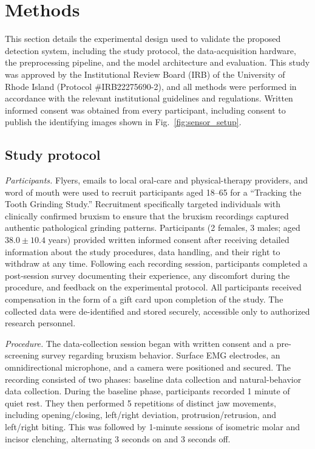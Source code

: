 \documentclass[pdflatex,sn-nature,iicol]{sn-jnl}
\begin{document}
\section{Methods}

This section details the experimental design used to validate the proposed detection system, including the study protocol, the data-acquisition hardware, the preprocessing pipeline, and the model architecture and evaluation. This study was approved by the Institutional Review Board (IRB) of the University of Rhode Island (Protocol \#IRB22275690-2), and all methods were performed in accordance with the relevant institutional guidelines and regulations. Written informed consent was obtained from every participant, including consent to publish the identifying images shown in Fig.~\ref{fig:sensor_setup}.

\subsection{Study protocol}
\textit{Participants.} Flyers, emails to local oral-care and physical-therapy providers, and word of mouth were used to recruit participants aged 18--65 for a ``Tracking the Tooth Grinding Study.'' Recruitment specifically targeted individuals with clinically confirmed bruxism to ensure that the bruxism recordings captured authentic pathological grinding patterns. Participants (2 females, 3 males; aged $38.0 \pm 10.4$ years) provided written informed consent after receiving detailed information about the study procedures, data handling, and their right to withdraw at any time. Following each recording session, participants completed a post-session survey documenting their experience, any discomfort during the procedure, and feedback on the experimental protocol. All participants received compensation in the form of a gift card upon completion of the study. The collected data were de-identified and stored securely, accessible only to authorized research personnel.

\textit{Procedure.} The data-collection session began with written consent and a pre-screening survey regarding bruxism behavior. Surface EMG electrodes, an omnidirectional microphone, and a camera were positioned and secured. The recording consisted of two phases: baseline data collection and natural-behavior data collection. During the baseline phase, participants recorded 1 minute of quiet rest. They then performed 5 repetitions of distinct jaw movements, including opening/closing, left/right deviation, protrusion/retrusion, and left/right biting. This was followed by 1-minute sessions of isometric molar and incisor clenching, alternating 3 seconds on and 3 seconds off.
\end{document}
